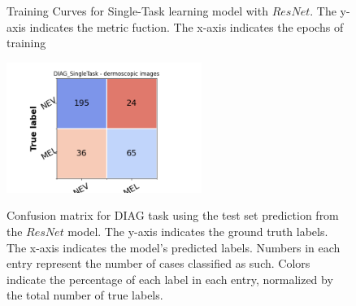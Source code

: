 \subsection{\texorpdfstring{}{TEXT}}
\label{ResNet}
\begin{figure}[ht]
\\
\caption{Training Curves for Single-Task learning model with $ResNet$. The y-axis indicates the metric fuction. The x-axis indicates the epochs of training}
\label{resNettraining}
\end{figure}
\begin{figure}[ht]
\centering
{\includegraphics[width =2.5in]{images/appendice/stl/resnet/DIAG_CM_SingleTask.png}}
\caption{Confusion matrix for DIAG task using the test set prediction
from the $ResNet$ model. The y-axis indicates the ground truth labels. The x-axis indicates the model’s predicted labels. Numbers in each entry represent
the number of cases classified as such. Colors indicate the percentage of each
label in each entry, normalized by the total number of true labels.}
\label{resNetCM}
\end{figure}
\clearpage

